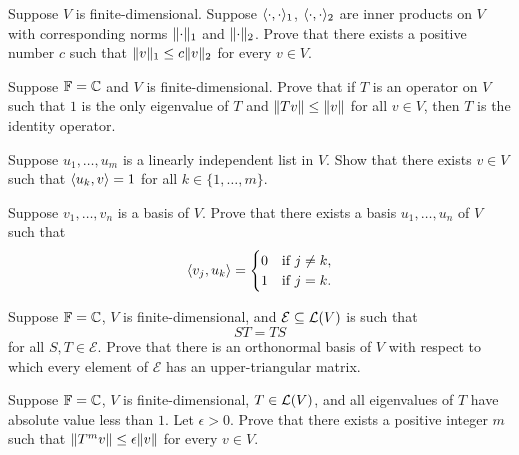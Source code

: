 \begin{exc}
\begin{exercise}
Suppose $V$ is finite-dimensional. Suppose $\langle \cdot, \cdot \rangle_1$,
$\langle \cdot, \cdot \rangle_2$ are inner products on $V$ with corresponding norms
$\lVert \cdot \rVert_1$ and $\lVert \cdot \rVert_2$. Prove that there exists a positive number
$c$ such that $\lVert v \rVert_1\le c\lVert v \rVert_2$ for every $v\in V$.
\end{exercise}

\begin{exercise}
Suppose $\mathbb{F}=\mathbb{C}$ and $V$ is finite-dimensional. Prove that if $T$ is an operator
on $V$ such that $1$ is the only eigenvalue of $T$ and $\lVert Tv \rVert\le\lVert v \rVert$
for all $v\in V$, then $T$ is the identity operator.
\end{exercise}

\begin{exercise}
Suppose $u_1,\dots,u_m$ is a linearly independent list in $V$. Show that there
exists $v\in V$ such that $\langle u_k, v \rangle=1$ for all $k\in\{1,\dots,m\}$.
\end{exercise}

\begin{exercise}
Suppose $v_1,\dots,v_n$ is a basis of $V$. Prove that there exists a basis
$u_1,\dots,u_n$ of $V$ such that
\[ \langle v_j, u_k \rangle = \begin{cases} 0 & \text{if } j\ne k,\\
                                 1 & \text{if } j=k. \end{cases} \]
\end{exercise}

\begin{exercise}
Suppose $\mathbb{F}=\mathbb{C}$, $V$ is finite-dimensional, and
$\mathcal{E}\subseteq\mathcal{L}(V)$ is such that
\[ ST = TS \]
for all $S,T\in\mathcal{E}$. Prove that there is an orthonormal basis of $V$
with respect to which every element of $\mathcal{E}$ has an upper-triangular
matrix.
\end{exercise}

\begin{exercise}
Suppose $\mathbb{F}=\mathbb{C}$, $V$ is finite-dimensional, $T\in\mathcal{L}(V)$, and all eigenvalues
of $T$ have absolute value less than $1$. Let $\epsilon>0$. Prove that there
exists a positive integer $m$ such that $\lVert T^mv \rVert\le\epsilon\lVert v \rVert$ for
every $v\in V$.
\end{exercise}


\end{exc}

